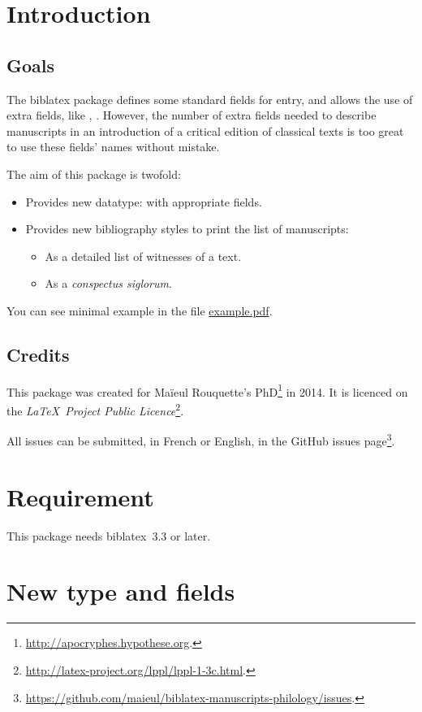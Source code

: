 \documentclass{ltxdockit}[2011/03/25]
\newcommand{\biblatex}{biblatex\xspace}
\begin{document}
\printtitlepage
\tableofcontents
\section{Introduction}
\subsection{Goals}
The \biblatex package defines some standard fields for entry, and allows the use 
of extra fields, like , . However, the number of 
extra fields needed to describe manuscripts in an introduction of a critical edition 
of classical texts is too great to use these fields' names without mistake.

The aim of this package is twofold:

\begin{itemize}
\item Provides new datatype:  with appropriate fields.
\item Provides new bibliography styles to print the list of manuscripts:
\begin{itemize}
	\item As a detailed list of witnesses of a text.
	\item As a \emph{conspectus siglorum}.
\end{itemize}
\end{itemize}

You can see minimal example in the file \href{file:example.pdf}{example.pdf}.
\subsection{Credits}

This package was created for Maïeul Rouquette's 
PhD\footnote{\url{http://apocryphes.hypothese.org}.} in 2014. It is licenced on 
the \emph{\LaTeX\ Project Public 
Licence}\footnote{\url{http://latex-project.org/lppl/lppl-1-3c.html}.}.

All issues can be submitted, in French or English, in the GitHub issues page\footnote{\url{https://github.com/maieul/biblatex-manuscripts-philology/issues}.}.

\section{Requirement}

This package needs \biblatex~3.3 or later.

\section{New type and fields}
\end{document}
